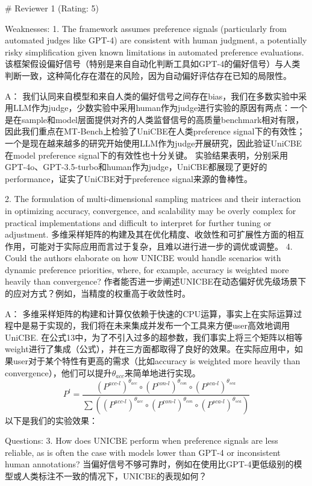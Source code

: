 # Reviewer 1 (Rating: 5)

Weaknesses:
1. The framework assumes preference signals (particularly from automated judges like GPT-4) are consistent with human judgment, a potentially risky simplification given known limitations in automated preference evaluations.
该框架假设偏好信号（特别是来自自动化判断工具如GPT-4的偏好信号）与人类判断一致，这种简化存在潜在的风险，因为自动偏好评估存在已知的局限性。

A：
我们认同来自模型和来自人类的偏好信号之间存在bias，我们在多数实验中采用LLM作为judge，少数实验中采用human作为judge进行实验的原因有两点：一个是在sample和model层面提供对齐的人类监督信号的高质量benchmark相对有限，因此我们重点在MT-Bench上检验了UniCBE在人类preference signal下的有效性；一个是现在越来越多的研究开始使用LLM作为judge开展研究，因此验证UniCBE在model preference signal下的有效性也十分关键。
实验结果表明，分别采用GPT-4o、GPT-3.5-turbo和human作为judge，UniCBE都展现了更好的performance，证实了UniCBE对于preference signal来源的鲁棒性。

2. The formulation of multi-dimensional sampling matrices and their interaction in optimizing accuracy, convergence, and scalability may be overly complex for practical implementations and difficult to interpret for further tuning or adjustment.
多维采样矩阵的构建及其在优化精度、收敛性和可扩展性方面的相互作用，可能对于实际应用而言过于复杂，且难以进行进一步的调优或调整。
4. Could the authors elaborate on how UNICBE would handle scenarios with dynamic preference priorities, where, for example, accuracy is weighted more heavily than convergence?
作者能否进一步阐述UNICBE在动态偏好优先级场景下的应对方式？例如，当精度的权重高于收敛性时。

A：
多维采样矩阵的构建和计算仅依赖于快速的CPU运算，事实上在实际运算过程中是易于实现的，我们将在未来集成并发布一个工具来方便user高效地调用UniCBE. 
在公式13中，为了不引入过多的超参数，我们事实上将三个矩阵以相等weight进行了集成（公式），并在三方面都取得了良好的效果。在实际应用中，如果user对于某个特性有更高的需求（比如accuracy is weighted more heavily than convergence），他们可以提升$\theta_{acc}$来简单地进行实现。
$$P^{l} = \frac{(P^{acc\text{-}l})^{\theta_{acc}} \circ (P^{con\text{-}l})^{\theta_{con}}  \circ (P^{sca\text{-}l})^{\theta_{sca}} }{\sum ((P^{acc\text{-}l})^{\theta_{acc}} \circ (P^{con\text{-}l})^{\theta_{con}}  \circ (P^{sca\text{-}l})^{\theta_{sca}})}$$
以下是我们的实验效果：


Questions:
3. How does UNICBE perform when preference signals are less reliable, as is often the case with models lower than GPT-4 or inconsistent human annotations?
当偏好信号不够可靠时，例如在使用比GPT-4更低级别的模型或人类标注不一致的情况下，UNICBE的表现如何？

